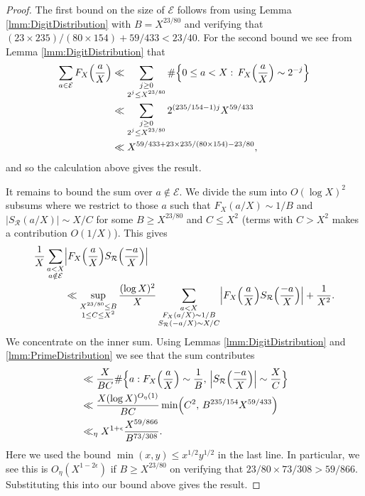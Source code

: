 \documentclass[10pt]{amsart}
\theoremstyle{plain}
\numberwithin{sblmm}{thrm}
\numberwithin{equation}{section}
\begin{document}
\begin{proof}
%
The first bound on the size of $\mathcal{E}$ follows from using Lemma \ref{lmm:DigitDistribution} with $B=X^{23/80}$ and verifying that $(23\times 235)/(80\times 154)+59/433<23/40$. For the second bound we see from Lemma \ref{lmm:DigitDistribution} that
\begin{align*}
\sum_{a\in\mathcal{E}} F_X\Bigl(\frac{a}{X}\Bigr)
&\ll \sum_{\substack{j\ge 0\\ 2^j\le X^{23/80}}} \#\Bigl\{0\le a<X:\,F_X\Bigl(\frac{a}{X}\Bigr)\sim 2^{-j}\Bigr\}\\
&\ll \sum_{\substack{j\ge 0\\ 2^j\le X^{23/80}}} 2^{(235/154-1)j} X^{59/433}\\
&\ll X^{59/433+23\times 235/(80\times 154)-23/80},
\end{align*}
and so the calculation above gives the result.

It remains to bound the sum over $a\notin\mathcal{E}$. We divide the sum into $O(\log{X})^2$ subsums where we restrict to those $a$ such that $F_X(a/X)\sim 1/B$ and $|S_{\mathcal{R}}(a/X)|\sim X/C$ for some $B\ge X^{23/80}$ and $C\le X^2$ (terms with $C>X^2$ makes a contribution $O(1/X)$). This gives
%
\begin{align*}
\frac{1}{X}\sum_{\substack{a<X\\ a\notin\mathcal{E}}}
&\Bigl|F_{X}\Bigl(\frac{a}{X}\Bigr)S_{\mathcal{R}}\Bigl(\frac{-a}{X}\Bigr)\Bigr|\\
&\ll \sup_{\substack{X^{23/80}\le B \\ 1\le C\le X^2}}\frac{(\log{X})^{2}}{X}\sum_{\substack{a<X\\ F_X(a/X)\sim 1/B \\ S_{\mathcal{R}}(-a/X)\sim X/C}}\Bigl|F_X\Bigl(\frac{a}{X}\Bigr)S_{\mathcal{R}}\Bigl(\frac{-a}{X}\Bigr)\Bigr|+\frac{1}{X^2}.
\end{align*}
%
We concentrate on the inner sum. Using Lemmas \ref{lmm:DigitDistribution} and \ref{lmm:PrimeDistribution} we see that the sum contributes
%
\begin{align*}
&\ll \frac{X}{B C}\#\Bigl\{a:F_X\Bigl(\frac{a}{X}\Bigr)\sim \frac{1}{B},\,\Bigl|S_{\mathcal{R}}\Bigl(\frac{-a}{X}\Bigr)\Bigr|\sim \frac{X}{C}\Bigr\}\\
&\ll \frac{X(\log{X})^{O_\eta(1)}}{B C} \min\Bigl(C^2,\,B^{235/154}X^{59/433}\Bigr)\\
&\ll_\eta X^{1+\epsilon}\frac{X^{59/866}}{B^{73/308}}.
\end{align*}
%
Here we used the bound $\min(x,y)\le x^{1/2}y^{1/2}$ in the last line. In particular, we see this is $O_\eta(X^{1-2\epsilon})$ if $B\ge X^{23/80}$ on verifying that $23/80\times 73/308>59/866$. Substituting this into our bound above gives the result.
%
\end{proof}
%
%
%
%
%
%
%
\end{document}
